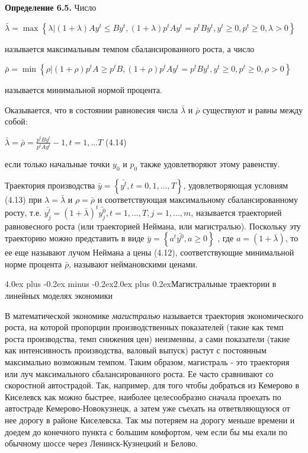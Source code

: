 \documentclass[12pt, 4paper]{book}
\makeatletter
\renewcommand{\section}{\@startsection{section}{1}{1pt}%
	{4.0ex plus -0.2ex minus -0.2ex}{2.0ex plus 0.2ex}{\centering\bf}}%
\makeatother
\begin{document}
{\textbf{Определение 6.5.} Число 
\begin{center}
$\bar{\lambda} = \max \left\{\lambda | (1+\lambda)A y^t \leq B y^t ,(1+ \lambda)p^t A y^t = p^t B y^t , y^t \geq 0, p^t \geq 0, \lambda > 0\right\}$
\end{center}
называется максимальным темпом сбалансированного роста, а число
\begin{center}
$\bar{\rho} = \min \left\{\rho|(1+\rho)p^t A \geq p^t B, (1+\rho)p^t A y^t = p^t B y^t, y^t \geq 0, p^t \geq 0, \rho > 0\right\}$
\end{center}
называется минимальной нормой процента.
\par

Оказывается, что в состоянии равновесия числа $\bar{\lambda}$ и $\bar{\rho}$ существуют и равны между собой:
\begin{center}
$\bar{\lambda}=\bar{\rho}=\frac{p^t B y^t}{p^t A y^t}-1, t=1,...T$ (4.14)
\end{center}
если только начальные точки $y_0$ и $p_0$ также удовлетворяют этому равенству.
\par

Траектория производства $\bar{y}=\left\{\bar{y^t}, t=0,1,...,T \right\}$, удовлетворяющая условиям (4.13) при $\lambda=\bar{\lambda}$ и $\rho = \bar{\rho}$ и соответствующая максимальному сбалансированному росту, т.е. $\bar{y_{j}^t}=(1+\bar{\lambda})^t \bar{y_{j}^{0}},t=1,...,T,j=1,...,m$, называется траекторией равновесного роста (или траекторией Неймана, или магистралью). Поскольку эту траекторию можно представить в виде $\bar{y}=\left\{a^t \bar{y^0}, a \geq 0 \right\}$ , где $a = (1 + \bar{\lambda})$, то ее еще называют лучом Неймана  а цены (4.12), соответствующие минимальной норме процента $\bar{\rho}$, называют неймановскими ценами.
\newpage
\begin{center}
\section{Магистральные траектории в линейных моделях экономики}
\end{center}
\par

В математической экономике \textit{магистралью} называется траектория экономического роста, на которой пропорции производственных показателей (такие как темп роста производства, темп снижения цен) неизменны, а сами показатели (такие как интенсивность производства, валовый выпуск) растут с постоянным максимально возможным темпом. Таким образом, магистраль - это траектория или луч максимального сбалансированного роста. Ее часто сравнивают со скоростной автострадой. Так, например, для того чтобы добраться из Кемерово в Киселевск как можно быстрее, наиболее целесообразно сначала проехать по автостраде Кемерово-Новокузнецк, а затем уже съехать на ответвляющуюся от нее дорогу в районе Киселевска. Так мы потеряем на дорогу меньше времени и доедем до конечного пункта с большим комфортом, чем если бы мы ехали по обычному шоссе через Ленинск-Кузнецкий и Белово.
\par

}
\end{document}
